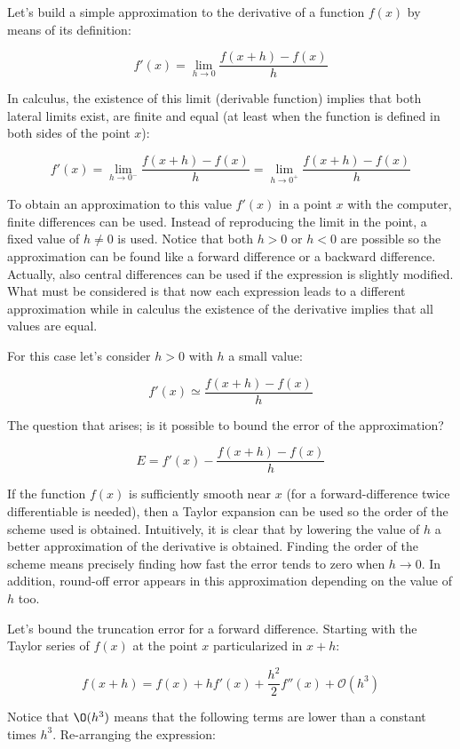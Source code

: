 Let's build a simple approximation to the derivative of a function $ f(x) $ by means of its definition:

$$
f'(x) = \lim_{h\rightarrow 0}\frac{f(x+h)-f(x)}{h}
$$

In calculus, the existence of this limit (derivable function) implies that both lateral limits exist, are finite and equal (at least when the function is defined in both sides of the point $x$):

$$
    f'(x) = \lim_{h\rightarrow 0^-}\frac{f(x+h)-f(x)}{h} = \lim_{h\rightarrow 0^+}\frac{f(x+h)-f(x)}{h}
$$

To obtain an approximation to this value $ f'(x) $ in a point $x $ with the computer, finite differences can be used. Instead of reproducing the limit in the point, a fixed value of $ h \neq 0$ is used. Notice that both $ h > 0 $ or $ h < 0 $ are possible so the approximation can be found like a forward difference or a backward difference. Actually, also central differences can be used if the expression is slightly modified. What must be considered is that now each expression leads to a different approximation while in calculus the existence of the derivative implies that all values are equal. 

For this case let's consider $ h > 0 $ with $h$ a small value:

$$
    f'(x) \simeq \frac{f(x+h)-f(x)}{h}
$$

The question that arises; is it possible to bound the error of the approximation? 

$$
    E = f'(x) - \frac{f(x+h)-f(x)}{h}
$$

If the function $f(x)$ is sufficiently smooth near $x$ (for a forward-difference twice differentiable is needed), then a Taylor expansion can be used so the order of the scheme used is obtained. Intuitively, it is clear that by lowering the value of $h$ a better approximation of the derivative is obtained. Finding the order of the scheme means precisely finding how fast the error tends to zero when $h\rightarrow 0$. In addition, round-off error appears in this approximation depending on the value of $h$ too.

Let's bound the truncation error for a forward difference. Starting with the Taylor series of $f(x)$ at the point $x$ particularized in $x+h$:

$$
f(x+h) = f(x) + h f'(x) + \frac{h^2}{2} f''(x) + \mathcal{O}(h^3) 
$$

Notice that $\O(h^3)$ means that the following terms are lower than a constant times $h^3$. Re-arranging the expression:

